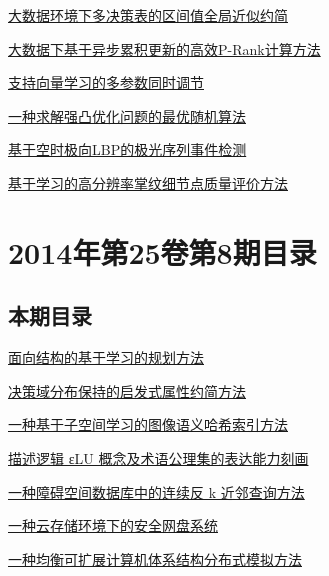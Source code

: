 \documentclass[a4paper]{article}
\begin{document}
\href{http://www.jos.org.cn/ch/reader/download_pdf.aspx?file_no=4640&year_id=2014&quarter_id=9&falg=1}{大数据环境下多决策表的区间值全局近似约简}

\href{http://www.jos.org.cn/ch/reader/download_pdf.aspx?file_no=4637&year_id=2014&quarter_id=9&falg=1}{大数据下基于异步累积更新的高效P-Rank计算方法}

\href{http://www.jos.org.cn/ch/reader/download_pdf.aspx?file_no=4650&year_id=2014&quarter_id=9&falg=1}{支持向量学习的多参数同时调节}

\href{http://www.jos.org.cn/ch/reader/download_pdf.aspx?file_no=4633&year_id=2014&quarter_id=9&falg=1}{一种求解强凸优化问题的最优随机算法}

\href{http://www.jos.org.cn/ch/reader/download_pdf.aspx?file_no=4647&year_id=2014&quarter_id=9&falg=1}{基于空时极向LBP的极光序列事件检测}

\href{http://www.jos.org.cn/ch/reader/download_pdf.aspx?file_no=4646&year_id=2014&quarter_id=9&falg=1}{基于学习的高分辨率掌纹细节点质量评价方法}


\section{\textbf{2014年第25卷第8期目录}}
\subsection{本期目录}
\href{http://www.jos.org.cn/ch/reader/download_pdf.aspx?file_no=4513&year_id=2014&quarter_id=8&falg=1}{面向结构的基于学习的规划方法}

\href{http://www.jos.org.cn/ch/reader/download_pdf.aspx?file_no=4507&year_id=2014&quarter_id=8&falg=1}{决策域分布保持的启发式属性约简方法}

\href{http://www.jos.org.cn/ch/reader/download_pdf.aspx?file_no=4488&year_id=2014&quarter_id=8&falg=1}{一种基于子空间学习的图像语义哈希索引方法}

\href{http://www.jos.org.cn/ch/reader/download_pdf.aspx?file_no=4460&year_id=2014&quarter_id=8&falg=1}{描述逻辑 εLU 概念及术语公理集的表达能力刻画}

\href{http://www.jos.org.cn/ch/reader/download_pdf.aspx?file_no=4459&year_id=2014&quarter_id=8&falg=1}{一种障碍空间数据库中的连续反 k 近邻查询方法}

\href{http://www.jos.org.cn/ch/reader/download_pdf.aspx?file_no=4463&year_id=2014&quarter_id=8&falg=1}{一种云存储环境下的安全网盘系统}

\href{http://www.jos.org.cn/ch/reader/download_pdf.aspx?file_no=4490&year_id=2014&quarter_id=8&falg=1}{一种均衡可扩展计算机体系结构分布式模拟方法}
\end{document}
